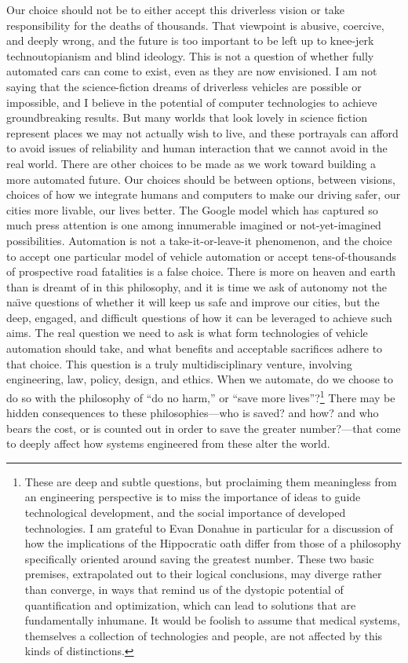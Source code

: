 Our choice should not be to either accept this driverless vision or take
responsibility for the deaths of thousands. That viewpoint is abusive, coercive,
and deeply wrong, and the future is too important to be left up to
knee-jerk technoutopianism and blind ideology. This is not a question
of whether fully automated cars can come to exist, even as they are
now envisioned. I am not saying that the science-fiction dreams of
driverless vehicles are possible or impossible, and I believe in the
potential of computer technologies to achieve groundbreaking results.
But many worlds that look lovely in science fiction represent places
we may not actually wish to live, and these portrayals can afford to
avoid issues of reliability and human interaction that we cannot avoid
in the real world. There are other choices to be made as we work toward building a
more automated future. Our choices should be between options, between
visions, choices of how we integrate humans and computers to make our
driving safer, our cities more livable, our lives better. The Google model which has
captured so much press attention is one among innumerable imagined or
not-yet-imagined possibilities. Automation is not a
take-it-or-leave-it phenomenon, and the choice to accept one
particular model of vehicle automation or accept tens-of-thousands of
prospective road fatalities is a false choice. There is more on heaven
and earth than is dreamt of in this philosophy, and it is time we ask
of autonomy not the na\"{\i}ve questions of whether it will keep us
safe and improve our cities, but the deep, engaged, and difficult
questions of how it can be leveraged to achieve such aims. The real
question we need to ask is what form technologies of vehicle automation 
should take, and what benefits and acceptable sacrifices adhere to
that choice. This question is a truly multidisciplinary venture,
involving engineering, law, policy, design, and ethics. When we
automate, do we choose to do so with the philosophy of ``do no harm,''
or ``save more lives''?\footnote{These are deep and subtle questions,
  but proclaiming them meaningless from an engineering perspective is
  to miss the importance of ideas to guide technological development,
  and the social importance of developed technologies. I am grateful
  to Evan Donahue in particular for a discussion of how the
  implications of the Hippocratic oath differ from those of a
  philosophy specifically oriented around saving the greatest number.
  These two basic premises, extrapolated out to their logical
  conclusions, may diverge rather than converge, in ways that remind
  us of the dystopic potential of quantification and optimization,
  which can lead to solutions that are fundamentally inhumane. It would be foolish
  to assume that medical systems, themselves a collection of
  technologies and people, are not affected by this kinds of distinctions.} There may be hidden consequences to these
philosophies---who is saved? and how? and who bears the cost, or is
counted out in order to save the greater number?---that come to deeply
affect how systems engineered from these alter the world.

